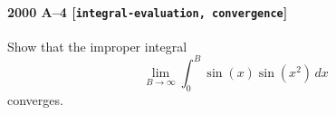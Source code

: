 \paragraph{2000 A--4 \textnormal{[\texttt{integral-evaluation, convergence}]}}
Show that the improper integral
\[ \lim_{B\to\infty}\int_{0}^B \sin(x) \sin(x^2)\,dx\]
converges.
